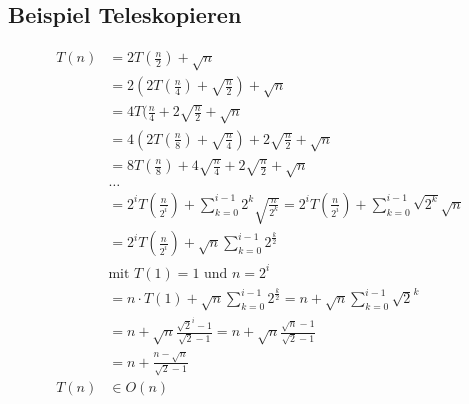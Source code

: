 \documentclass[a4paper,10pt]{article}
\newcommand{\T}[1]{\text{#1}} %
\newcommand{\Sum}[2]{\sum_{#1}^{#2}} %
\begin{document}
\subsection{Beispiel Teleskopieren}
\begin{align*}
T(n) &= 2T(\frac{n}{2})+\sqrt{n}\\
&= 2(2T(\frac{n}{4})+\sqrt{\frac{n}{2}})+\sqrt{n}\\
&= 4T(\frac{n}{4}+2\sqrt{\frac{n}{2}}+\sqrt{n}\\
&= 4(2T(\frac{n}{8})+\sqrt{\frac{n}{4}})+2\sqrt{\frac{n}{2}}+\sqrt{n}\\
&= 8T(\frac{n}{8})+4\sqrt{\frac{n}{4}}+2\sqrt{\frac{n}{2}}+\sqrt{n}\\
&\dots\\
&=2^iT(\frac{n}{2^i})+\Sum{k=0}{i-1}2^k\sqrt{\frac{n}{2^k}}=2^i T(\frac{n}{2^i})+\Sum{k=0}{i-1}\sqrt{2^k}\sqrt{n}\\
&=2^iT(\frac{n}{2^i})+\sqrt{n}\Sum{k=0}{i-1}2^\frac{k}{2}\\
&\T{mit }T(1)=1\T{ und }n=2^i\\
&=n\cdot T(1)+\sqrt{n}\Sum{k=0}{i-1}2^\frac{k}{2}=n+\sqrt{n}\Sum{k=0}{i-1}\sqrt{2}^k\\
&=n+\sqrt{n}\frac{\sqrt{2}^i-1}{\sqrt{2}-1}=n+\sqrt{n}\frac{\sqrt{n}-1}{\sqrt{2}-1}\\
&=n+\frac{n-\sqrt{n}}{\sqrt{2}-1}\\
T(n)&\in O(n)
\end{align*}
\end{document}
